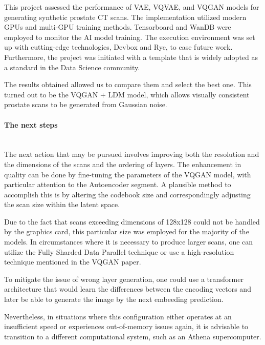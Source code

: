 This project assessed the performance of VAE, VQVAE, and VQGAN models for generating synthetic prostate CT scans. The implementation utilized modern GPUs and multi-GPU training methods. Tensorboard and WanDB were employed to monitor the AI model training. The execution environment was set up with cutting-edge technologies, Devbox and Rye, to ease future work. Furthermore, the project was initiated with a template that is widely adopted as a standard in the Data Science community.

 The results obtained allowed us to compare them and select the best one. This turned out to be the VQGAN + LDM model\cite{khader2023medicaldiffusiondenoisingdiffusion}, which allows visually consistent prostate scans to be generated from Gaussian noise.  

\paragraph{The next steps}\mbox{}\\
\indent The next action that may be pursued involves improving both the resolution and the dimensions of the scans and the ordering of layers. The enhancement in quality can be done by fine-tuning the parameters of the VQGAN model, with particular attention to the Autoencoder segment. A plausible method to accomplish this is by altering the codebook size and correspondingly adjusting the scan size within the latent space.

Due to the fact that scans exceeding dimensions of 128x128 could not be handled by the graphics card, this particular size was employed for the majority of the models. In circumstances where it is necessary to produce larger scans, one can utilize the Fully Sharded Data Parallel technique or use a high-resolution technique mentioned in the VQGAN paper\cite{esser2021tamingtransformershighresolutionimage}. 

To mitigate the issue of wrong layer generation, one could use a transformer architecture that would learn the differences between the encoding vectors and later be able to generate the image by the next embeeding prediction\cite{esser2021tamingtransformershighresolutionimage}\cite{khader_transformers_2023}. 

Nevertheless, in situations where this configuration either operates at an insufficient speed or experiences out-of-memory issues again, it is advisable to transition to a different computational system, such as an Athena supercomputer.

